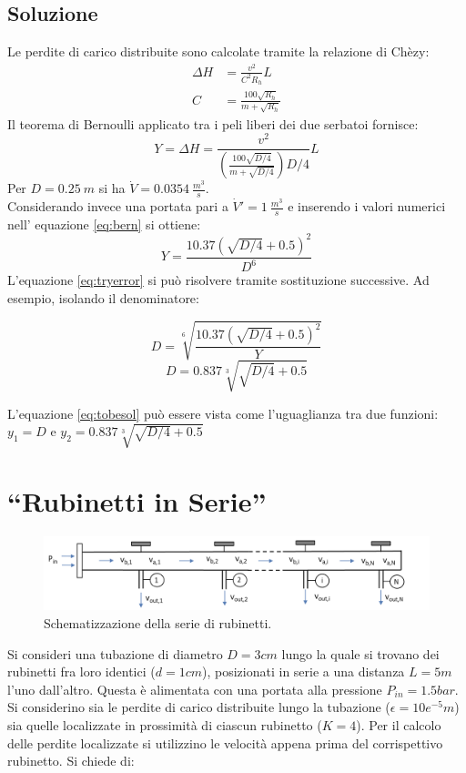 \documentclass[oneside]{article}
\begin{document}
\subsection*{Soluzione}
Le perdite di carico distribuite sono calcolate tramite la relazione di Chèzy:
\begin{align}
   \Delta H &= \frac{v^2}{C^2 R_h}L \\
   C &= \frac{100 \sqrt{R_h}}{m + \sqrt{R_h}}
\end{align}
Il teorema di Bernoulli applicato tra i peli liberi dei due serbatoi fornisce:
\begin{equation}
   \label{eq:bern}
   Y = \Delta H = \frac{v^2}{\left(\frac{100\sqrt{D/4}}{m + \sqrt{D/4}}\right)D/4}L
\end{equation}
Per $D = 0.25 \: m$ si ha $\dot{V} = 0.0354 \: \frac{m^3}{s}$.\\
Considerando invece una portata pari a $\dot{V}' = 1 \: \frac{m^3}{s}$ e inserendo i
valori numerici nell' equazione \ref{eq:bern} si ottiene:
\begin{equation}
   \label{eq:tryerror}
   Y = \frac{10.37 \left(\sqrt{D/4} + 0.5\right)^2}{D^6}
\end{equation}
L'equazione \ref{eq:tryerror} si può risolvere tramite sostituzione successive. Ad
esempio, isolando il denominatore:

\begin{equation}
   D = \sqrt[6]{\frac{10.37 \left(\sqrt{D/4} + 0.5\right)^2}{Y}}
\end{equation}
\begin{equation}
   \label{eq:tobesol}
   D = 0.837 \sqrt[3]{\sqrt{D/4} + 0.5}
\end{equation}

L'equazione \ref{eq:tobesol} può essere vista come l'uguaglianza tra due funzioni: $y_1 =
D$ e $y_2 = 0.837\sqrt[3]{\sqrt{D/4} + 0.5}$

\section{``Rubinetti in Serie''}
\begin{figure}[htp]
    \centering
    \includegraphics[width=1.\textwidth]{RubinettiInSerie.png}
    \caption{Schematizzazione della serie di rubinetti.}
    \label{fig:figura_1}
\end{figure}
Si consideri una tubazione di diametro $D = 3 cm $ lungo la quale si trovano dei
rubinetti fra loro identici ($d =1 cm$),  posizionati  in serie  a  una  distanza $L = 5
m$ l’uno dall’altro. Questa è alimentata con una portata alla pressione $P_{in} = 1.5
bar$.  Si  considerino  sia  le  perdite di  carico  distribuite lungo  la  tubazione
($\epsilon = 10e^{-5} m$) sia quelle localizzate in prossimità di ciascun rubinetto ($K =
4$). Per il calcolo delle perdite localizzate si utilizzino le velocità appena prima del
corrispettivo rubinetto. Si chiede di:
\end{document}
